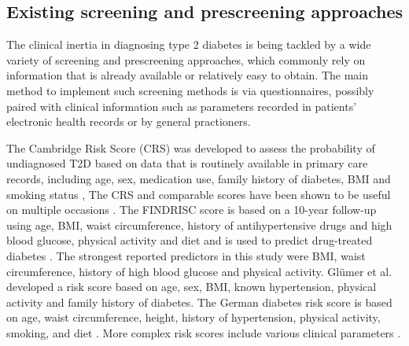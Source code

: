 \subsection{Existing screening and prescreening approaches} \label{intro:screening-existing}
The clinical inertia in diagnosing type 2 diabetes is being tackled by a wide variety of screening and prescreening approaches, which commonly rely on information that is already available or relatively easy to obtain. The main method to implement such screening methods is via questionnaires, possibly paired with clinical information such as parameters recorded in patients' electronic health records or by general practioners. 

The Cambridge Risk Score (CRS) was developed to assess the probability of undiagnosed T2D based on data that is routinely available in primary care records, including age, sex, medication use, family history of diabetes, BMI and smoking status \citep{griffin2000diabetes}, The CRS and comparable scores have been shown to be useful on multiple occasions \citep{baan1999performance,griffin2000diabetes, park2002performance, spijkerman2004performance}. 
The FINDRISC score is based on a 10-year follow-up using age, BMI, waist circumference, history of antihypertensive drugs and high blood glucose, physical activity and diet and is used to predict drug-treated diabetes \citep{lindstrom2003diabetes}. The strongest reported predictors in this study were BMI, waist circumference, history of high blood glucose and physical activity. Gl{\"u}mer et al. \citep{glumer2004danish} developed a risk score based on age, sex, BMI, known hypertension, physical activity and family history of diabetes. The German diabetes risk score is based on age, waist circumference, height, history of hypertension, physical activity, smoking, and diet \citep{schulze2007accurate}.
More complex risk scores include various clinical parameters \citep{heikes2008diabetes, stern2002identification, mcneely2003comparison}.




